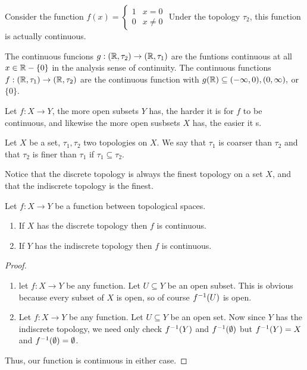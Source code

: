 \documentclass[12pt, twosided]{article}
\begin{document}
\begin{exa}
  Consider the function
  \(f(x) = \begin{cases} 1 & x = 0 \\ 0 & x \neq 0 \end{cases}\)
  Under the topology \(\tau_2\), this function is actually continuous.
\end{exa}

\begin{fact}
  The continuous funcions \(g: (\mathbb{R}, \tau_2) \to (\mathbb{R}, \tau_1)\)  are the funtions continuous at all \(x \in \mathbb{R} - \{0\}\) in the analysis sense of continuity.
  The continuous functions \(f:(\mathbb{R}, \tau_1) \to (\mathbb{R}, \tau_2)\) are the continuous function with \(g(\mathbb{R}) \subseteq (-\infty, 0), (0, \infty),\) or \(\{0\}\).
\end{fact}

\begin{idea}
  Let \(f: X \to Y\), the more open subsets \(Y\) has, the harder it is for \(f\) to be continuous, and likewise the more open susbsets \(X\) has, the easier it s.
\end{idea}


\begin{df}
  Let \(X\) be a set, \(\tau_1, \tau_2\) two topologies on \(X\). We say that \(\tau_1\) is coarser than \(\tau_2\) and that \(\tau_2\) is finer than \(\tau_1\) if \(\tau_1 \subseteq \tau_2\).
\end{df}

\begin{exa}
  Notice that the discrete topology is always the finest topology on a set \(X\), and that the indiscrete topology is the finest.
\end{exa}

\begin{prop}
  Let \(f: X \to Y\) be a function between topological spaces.
  \begin{enumerate}
  \item If \(X\) has the discrete topology then \(f\) is continuous.
  \item If \(Y\) has the indiscrete topology then \(f\) is continuous.
  \end{enumerate}
\end{prop}
\begin{proof}
  \begin{enumerate}
  \item let \(f: X \to Y\) be any function. Let \(U \subseteq Y\) be an open subset. This is obvious because every subset of \(X\) is open, so of course \(f^{-1}(U)\) is open.
  \item Let \(f:X \to Y\) be any function. Let \(U \subseteq Y\) be an open set. Now since \(Y\) has the indiscrete topology, we need only check \(f^{-1}(Y)\) and \(f^{-1}(\emptyset)\) but \(f^{-1}(Y) = X\) and \(f^{-1}(\emptyset) = \emptyset\).
  \end{enumerate}
  Thus, our function is continuous in either case.
\end{proof}
\end{document}
